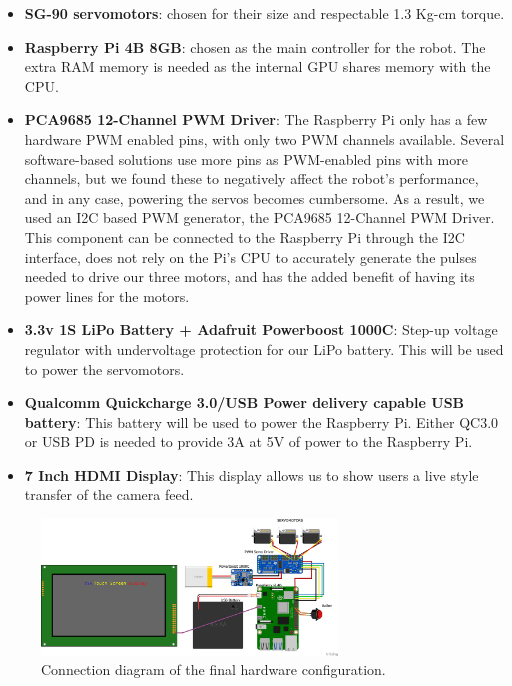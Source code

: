 \begin{itemize}
    \item \textbf{SG-90 servomotors}: chosen for their size and respectable 1.3 Kg-cm torque. 
    \item \textbf{Raspberry Pi 4B 8GB}: chosen as the main controller for the robot. The extra RAM memory is needed as the internal GPU shares memory with the CPU.
    
    \item \textbf{PCA9685 12-Channel PWM Driver}: The Raspberry Pi only has a few hardware PWM enabled pins, with only two PWM channels available. Several software-based solutions use more pins as PWM-enabled pins with more channels, but we found these to negatively affect the robot's performance, and in any case, powering the servos becomes cumbersome. As a result, we used an I2C based PWM generator, the PCA9685 12-Channel PWM Driver. This component can be connected to the Raspberry Pi through the I2C interface, does not rely on the Pi's CPU to accurately generate the pulses needed to drive our three motors, and has the added benefit of having its power lines for the motors.
    \item \textbf{3.3v 1S LiPo Battery + Adafruit Powerboost 1000C}: Step-up voltage regulator with undervoltage protection for our LiPo battery. This will be used to power the servomotors.
    
    \item \textbf{Qualcomm Quickcharge 3.0/USB Power delivery capable USB battery}: This battery will be used to power the Raspberry Pi. Either QC3.0 or USB PD is needed to provide 3A at 5V of power to the Raspberry Pi.
    
    \item \textbf{7 Inch HDMI Display}: This display allows us to show users a live style transfer of the camera feed.
    \end{itemize}

    \begin{figure}[h]
        \centering
        \includegraphics[width =0.7\textwidth]{resources/fritzing.png}
        \caption{Connection diagram of the final hardware configuration.}\label{fig:hardware_configuration}
    \end{figure}  
    



